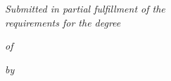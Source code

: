 \begin{titlepage}
    \thispagestyle{empty}
    \begin{center}
        
        \noindent

        \vspace{1.2\baselineskip}
        
        {\LARGE \textit{Submitted in partial fulfillment of the}}\\
        {\LARGE \textit{requirements for the degree}} \par
        
        \vspace{\baselineskip}
        
        {\LARGE \textit{of}} \par
        
        \vspace{\baselineskip}
        
        {\LARGE \bf \mydegree \par} 
        
        \vspace{\baselineskip}
        
        {\LARGE \textit{by}} \par
        
        \vspace{\baselineskip}
        
        {
        \selectfont
        }
\end{center}
\end{titlepage}
